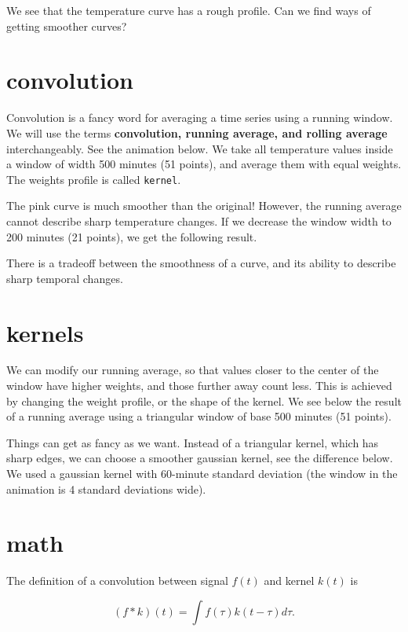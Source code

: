 \documentclass[
  letterpaper,
  DIV=11,
  numbers=noendperiod,
  oneside]{scrreprt}
\begin{document}
We see that the temperature curve has a rough profile. Can we find ways
of getting smoother curves?

\hypertarget{convolution-1}{%
\section{convolution}\label{convolution-1}}

Convolution is a fancy word for averaging a time series using a running
window. We will use the terms \textbf{convolution, running average, and
rolling average} interchangeably. See the animation below. We take all
temperature values inside a window of width 500 minutes (51 points), and
average them with equal weights. The weights profile is called
\texttt{kernel}.

The pink curve is much smoother than the original! However, the running
average cannot describe sharp temperature changes. If we decrease the
window width to 200 minutes (21 points), we get the following result.

There is a tradeoff between the smoothness of a curve, and its ability
to describe sharp temporal changes.

\hypertarget{kernels}{%
\section{kernels}\label{kernels}}

We can modify our running average, so that values closer to the center
of the window have higher weights, and those further away count less.
This is achieved by changing the weight profile, or the shape of the
kernel. We see below the result of a running average using a triangular
window of base 500 minutes (51 points).

Things can get as fancy as we want. Instead of a triangular kernel,
which has sharp edges, we can choose a smoother gaussian kernel, see the
difference below. We used a gaussian kernel with 60-minute standard
deviation (the window in the animation is 4 standard deviations wide).

\hypertarget{math}{%
\section{math}\label{math}}

The definition of a convolution between signal \(f(t)\) and kernel
\(k(t)\) is

\[
(f * k)(t) = \int f(\tau)k(t-\tau)d\tau.
\]
\end{document}
